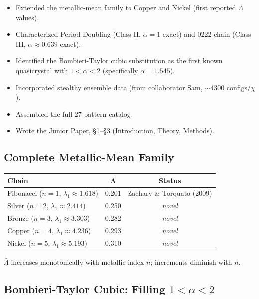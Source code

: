 \documentclass[11pt,letterpaper]{article}
\begin{document}
\begin{itemize}[leftmargin=1.5em]
  \item Extended the metallic-mean family to Copper and Nickel (first reported $\bar\Lambda$ values).
  \item Characterized Period-Doubling (Class II, $\alpha=1$ exact) and
    0222 chain (Class III, $\alpha\approx0.639$ exact).
  \item Identified the Bombieri-Taylor cubic substitution as the first known
    quasicrystal with $1 < \alpha < 2$ (specifically $\alpha = 1.545$).
  \item Incorporated stealthy ensemble data (from collaborator Sam, $\sim$4300 configs/\(\chi\)).
  \item Assembled the full 27-pattern catalog.
  \item Wrote the Junior Paper, §1–§3 (Introduction, Theory, Methods).
\end{itemize}

\subsection{Complete Metallic-Mean Family}

\begin{table}[H]\centering
\begin{tabular}{lcc}
\toprule
\textbf{Chain} & $\boldsymbol{\bar{\Lambda}}$ & \textbf{Status} \\
\midrule
Fibonacci ($n=1$, $\lambda_1\approx1.618$) & 0.201 & Zachary \& Torquato (2009) \\
Silver    ($n=2$, $\lambda_1\approx2.414$) & 0.250 & \textit{novel} \\
Bronze    ($n=3$, $\lambda_1\approx3.303$) & 0.282 & \textit{novel} \\
Copper    ($n=4$, $\lambda_1\approx4.236$) & 0.293 & \textit{novel} \\
Nickel    ($n=5$, $\lambda_1\approx5.193$) & 0.310 & \textit{novel} \\
\bottomrule
\end{tabular}
\end{table}

$\bar\Lambda$ increases monotonically with metallic index $n$; increments diminish with $n$.

\subsection{Bombieri-Taylor Cubic: Filling $1 < \alpha < 2$}
\end{document}
